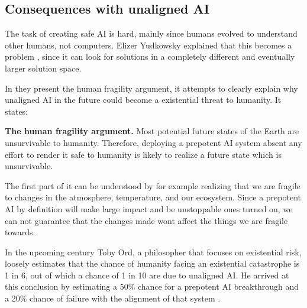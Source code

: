 \documentclass[12pt,A4]{report}
\theoremstyle{definition}
\begin{document}

\subsection{Consequences with unaligned AI}
The task of creating safe AI is hard, mainly since humans evolved to understand other humans, not computers. Elizer Yudkowsky explained that this becomes a problem \autocite{Yudkowsky speech}, since it can look for solutions in a completely different and eventually larger solution space.  

In \autocite{Critch Kruger} they present the human fragility argument, it attempts to clearly explain why unaligned AI in the future could become a existential threat to humanity. It states:
\begin{displayquote}
\textbf{The human fragility argument.} Most potential future states of the Earth are unsurvivable to humanity. Therefore, deploying a prepotent AI system absent any effort to render it safe to humanity is likely to realize a future state which is unsurvivable. 
\end{displayquote}
The first part of it can be understood by for example realizing that we are fragile to changes in the atmosphere, temperature, and our ecosystem. Since a prepotent AI by definition will make large impact and be unstoppable ones turned on, we can not guarantee that the changes made wont affect the things we are fragile towards. 



In the upcoming century Toby Ord, a philosopher that focuses on existential risk, loosely estimates that the chance of humanity facing an existential catastrophe is 1 in 6, out of which a chance of 1 in 10 are due to unaligned AI\autocite{precipice}. He arrived at this conclusion by estimating a 50\% chance for a prepotent AI breakthrough and a 20\% chance of failure with the alignment of that system \autocite{rationally speaking}.
\end{document}
